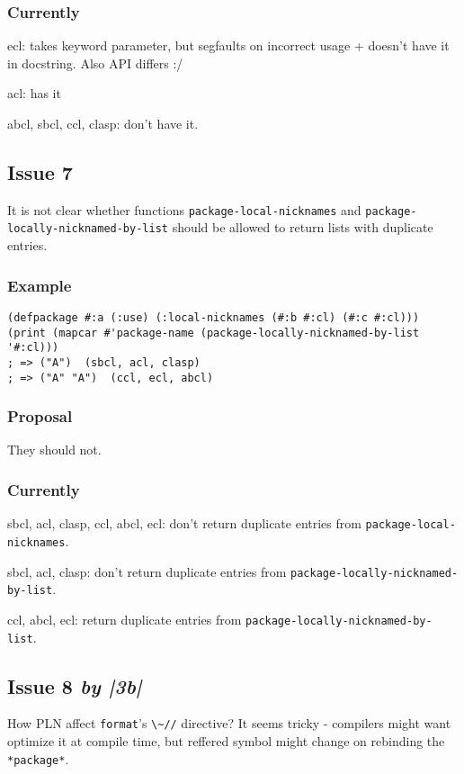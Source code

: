 \documentclass[11pt]{article}
\begin{document}
\subsubsection{Currently}
\label{sec:orgf1b9355}
ecl: takes keyword parameter, but segfaults on incorrect usage + doesn't
have it in docstring. Also API differs :/

acl: has it

abcl, sbcl, ccl, clasp: don't have it.
\subsection{Issue 7}
\label{sec:org88112c4}
It is not clear whether functions \texttt{package-local-nicknames} and
\texttt{package-locally-nicknamed-by-list} should be allowed to return lists with
duplicate entries.
\subsubsection{Example}
\label{sec:orgefc34eb}
\begin{verbatim}
(defpackage #:a (:use) (:local-nicknames (#:b #:cl) (#:c #:cl)))
(print (mapcar #'package-name (package-locally-nicknamed-by-list '#:cl)))
; => ("A")  (sbcl, acl, clasp)
; => ("A" "A")  (ccl, ecl, abcl)
\end{verbatim}
\subsubsection{Proposal}
\label{sec:orgbbb2690}
They should not.
\subsubsection{Currently}
\label{sec:org342899c}
sbcl, acl, clasp, ccl, abcl, ecl: don't return duplicate entries from \texttt{package-local-nicknames}.

sbcl, acl, clasp: don't return duplicate entries from \texttt{package-locally-nicknamed-by-list}.

ccl, abcl, ecl: return duplicate entries from \texttt{package-locally-nicknamed-by-list}.
\subsection{Issue 8 \emph{by |3b|}}
\label{sec:org3661e59}
How PLN affect \texttt{format}'s \texttt{\textbackslash{}\textasciitilde{}//} directive? It seems tricky - compilers might
want optimize it at compile time, but reffered symbol might change on
rebinding the \texttt{*package*}.
\end{document}
